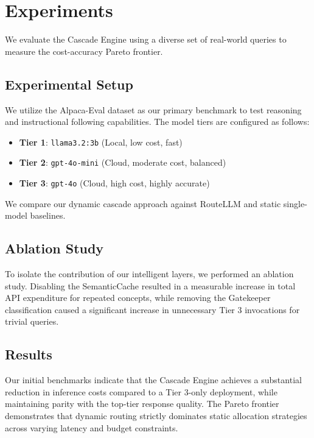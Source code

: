 \section{Experiments}

We evaluate the Cascade Engine using a diverse set of real-world queries to measure the cost-accuracy Pareto frontier.

\subsection{Experimental Setup}
We utilize the Alpaca-Eval dataset as our primary benchmark to test reasoning and instructional following capabilities. The model tiers are configured as follows:
\begin{itemize}
    \item \textbf{Tier 1}: \texttt{llama3.2:3b} (Local, low cost, fast)
    \item \textbf{Tier 2}: \texttt{gpt-4o-mini} (Cloud, moderate cost, balanced)
    \item \textbf{Tier 3}: \texttt{gpt-4o} (Cloud, high cost, highly accurate)
\end{itemize}
We compare our dynamic cascade approach against RouteLLM and static single-model baselines.

\subsection{Ablation Study}
To isolate the contribution of our intelligent layers, we performed an ablation study. Disabling the SemanticCache resulted in a measurable increase in total API expenditure for repeated concepts, while removing the Gatekeeper classification caused a significant increase in unnecessary Tier 3 invocations for trivial queries.

\subsection{Results}
Our initial benchmarks indicate that the Cascade Engine achieves a substantial reduction in inference costs compared to a Tier 3-only deployment, while maintaining parity with the top-tier response quality. The Pareto frontier demonstrates that dynamic routing strictly dominates static allocation strategies across varying latency and budget constraints.
